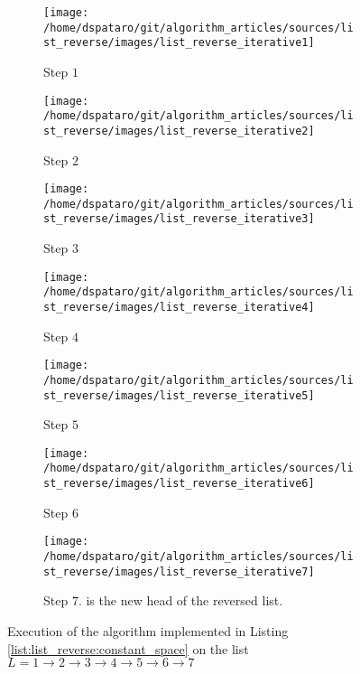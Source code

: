 \begin{figure}
	\vspace*{-0.5in}
	\centering
	\begin{subfigure}[t]{0.49\textwidth}
		\centering
		\texttt{[image: /home/dspataro/git/algorithm\_articles/sources/list\_reverse/images/list\_reverse\_iterative1]}
		\caption[]{Step $1$}
		\label{fig:list_reverse:list_reverse_iterative1}
	 \end{subfigure}
	\hfill
	\begin{subfigure}[t]{0.49\textwidth}
		\centering
		\texttt{[image: /home/dspataro/git/algorithm\_articles/sources/list\_reverse/images/list\_reverse\_iterative2]}
		\caption[]{Step $2$}
		\label{fig:list_reverse:list_reverse_iterative2}
	 \end{subfigure}
	 \hfill
	 \begin{subfigure}[t]{0.49\textwidth}
		\centering
		\texttt{[image: /home/dspataro/git/algorithm\_articles/sources/list\_reverse/images/list\_reverse\_iterative3]}
		\caption[]{Step $3$}
		\label{fig:list_reverse:list_reverse_iterative3}
	 \end{subfigure}
	 \hfill
	 \begin{subfigure}[t]{0.49\textwidth}
		\centering
		\texttt{[image: /home/dspataro/git/algorithm\_articles/sources/list\_reverse/images/list\_reverse\_iterative4]}
		\caption[]{Step $4$}
		\label{fig:list_reverse:list_reverse_iterative4}
	 \end{subfigure}
	 \hfill
	 \begin{subfigure}[t]{0.49\textwidth}
		\centering
		\texttt{[image: /home/dspataro/git/algorithm\_articles/sources/list\_reverse/images/list\_reverse\_iterative5]}
		\caption[]{Step $5$}
		\label{fig:list_reverse:list_reverse_iterative5}
	 \end{subfigure}
	 \hfill
	 \begin{subfigure}[t]{0.49\textwidth}
		\centering
		\texttt{[image: /home/dspataro/git/algorithm\_articles/sources/list\_reverse/images/list\_reverse\_iterative6]}
		\caption[]{Step $6$}
		\label{fig:list_reverse:list_reverse_iterative6}
	 \end{subfigure}
	 \hfill
	 \begin{subfigure}[t]{0.49\textwidth}
		\centering
		\texttt{[image: /home/dspataro/git/algorithm\_articles/sources/list\_reverse/images/list\_reverse\_iterative7]}
		\caption[]{Step $7$.  is the new head of the reversed list.}
		\label{fig:list_reverse:list_reverse_iterative7}
	 \end{subfigure}
\caption{Execution of the algorithm implemented in Listing \ref{list:list_reverse:constant_space} on the list $L = 1 \rightarrow 2 \rightarrow 3 \rightarrow 4 \rightarrow 5 \rightarrow 6 \rightarrow 7$}
\label{fig:list_reverse:list_reverse_iterative_execution}
\end{figure}

